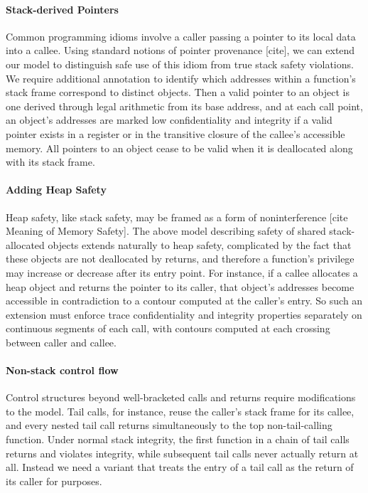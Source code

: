 \documentclass[acmsmall,review,anonymous]{acmart}\settopmatter{printfolios=true,printccs=false,printacmref=false}
\begin{document}
  \paragraph{Stack-derived Pointers}

    Common programming idioms involve a caller passing a pointer to its local
    data into a callee. Using standard notions of pointer provenance [cite],
    we can extend our model to distinguish safe use of this idiom from true
    stack safety violations. We require additional annotation to identify
    which addresses within a function's stack frame correspond to distinct
    objects. Then a valid pointer to an object is one derived through legal
    arithmetic from its base address, and at each call point, an object's
    addresses are marked low confidentiality and integrity if a valid pointer
    exists in a register or in the transitive closure of the callee's
    accessible memory. All pointers to an object cease to be valid when it is
    deallocated along with its stack frame.

  \paragraph{Adding Heap Safety}

    Heap safety, like stack safety, may be framed as a form of noninterference
    [cite Meaning of Memory Safety]. The above model describing safety of
    shared stack-allocated objects extends naturally to heap safety,
    complicated by the fact that these objects are not deallocated by returns,
    and therefore a function's privilege may increase or decrease after its
    entry point. For instance, if a callee allocates a heap object and returns
    the pointer to its caller, that object's addresses become accessible in
    contradiction to a contour computed at the caller's entry. So such an
    extension must enforce trace confidentiality and integrity properties
    separately on continuous segments of each call, with contours computed at
    each crossing between caller and callee.

  \paragraph{Non-stack control flow}

    Control structures beyond well-bracketed calls and returns require
    modifications to the model. Tail calls, for instance, reuse the caller's
    stack frame for its callee, and every nested tail call returns
    simultaneously to the top non-tail-calling function. Under normal stack
    integrity, the first function in a chain of tail calls returns and violates
    integrity, while subsequent tail calls never actually return at all.
    Instead we need a variant that treats the entry of a tail call as the
    return of its caller for purposes.
\end{document}
